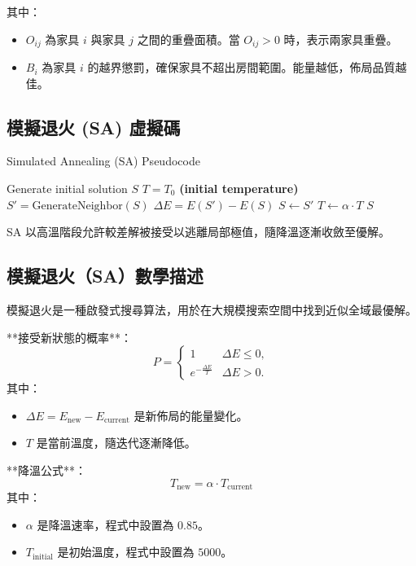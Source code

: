 \documentclass[conference]{IEEEtran}
\begin{document}
其中：
\begin{itemize}
    \item \( O_{ij} \) 為家具 \( i \) 與家具 \( j \) 之間的重疊面積。當 \( O_{ij} > 0 \) 時，表示兩家具重疊。
    \item \( B_i \) 為家具 \( i \) 的越界懲罰，確保家具不超出房間範圍。能量越低，佈局品質越佳。
\end{itemize}

\subsection{模擬退火 (SA) 虛擬碼}
{\small
\begin{algorithm}[!htbp]
\caption{Simulated Annealing (SA) Pseudocode}
\begin{algorithmic}[1]
\STATE Generate initial solution \( S \)
\STATE \( T = T_0 \) \textbf{(initial temperature)}
        \STATE \( S' = \text{GenerateNeighbor}(S) \)
        \STATE \( \Delta E = E(S') - E(S) \)
            \STATE \( S \leftarrow S' \)
        \ENDIF
    \ENDFOR
    \STATE \( T \leftarrow \alpha \cdot T \)
\ENDWHILE
\RETURN \( S \)
\end{algorithmic}
\end{algorithm}
}

SA 以高溫階段允許較差解被接受以逃離局部極值，隨降溫逐漸收斂至優解。

\subsection{模擬退火（SA）數學描述}
模擬退火是一種啟發式搜尋算法，用於在大規模搜索空間中找到近似全域最優解。

**接受新狀態的概率**：
\[
P = 
\begin{cases} 
1 & \Delta E \leq 0, \\
e^{-\frac{\Delta E}{T}} & \Delta E > 0.
\end{cases}
\]
其中：
\begin{itemize}
    \item \( \Delta E = E_{\text{new}} - E_{\text{current}} \) 是新佈局的能量變化。
    \item \( T \) 是當前溫度，隨迭代逐漸降低。
\end{itemize}

**降溫公式**：
\[
T_{\text{new}} = \alpha \cdot T_{\text{current}}
\]
其中：
\begin{itemize}
    \item \( \alpha \) 是降溫速率，程式中設置為 \( 0.85 \)。
    \item \( T_{\text{initial}} \) 是初始溫度，程式中設置為 \( 5000 \)。
\end{itemize}
\end{document}
